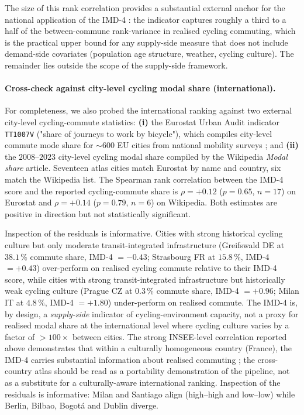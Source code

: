 \documentclass[11pt,a4paper]{article}
\begin{document}
The size of this rank correlation provides a substantial
external anchor for the national application of the IMD-4 :
the indicator captures roughly a third to a half of the
between-commune rank-variance in realised cycling commuting,
which is the practical upper bound for any supply-side measure
that does not include demand-side covariates (population
age structure, weather, cycling culture).  The remainder lies
outside the scope of the supply-side framework.

\paragraph{Cross-check against city-level cycling modal share
(international).}
For completeness, we also probed the international ranking
against two external city-level cycling-commute statistics:
\textbf{(i)} the Eurostat Urban Audit indicator \texttt{TT1007V}
("share of journeys to work by bicycle"), which compiles
city-level commute mode share for $\sim 600$ EU cities from
national mobility surveys ; and \textbf{(ii)} the
$2008$--$2023$ city-level cycling modal share compiled by the
Wikipedia \emph{Modal share} article.  Seventeen atlas cities
match Eurostat by name and country, six match the Wikipedia
list.  The Spearman rank correlation between the IMD-4 score
and the reported cycling-commute share is $\rho = +0.12$
($p = 0.65$, $n = 17$) on Eurostat and $\rho = +0.14$
($p = 0.79$, $n = 6$) on Wikipedia.  Both estimates are positive
in direction but not statistically significant.

Inspection of the residuals is informative.  Cities with strong
historical cycling culture but only moderate transit-integrated
infrastructure (Greifswald DE at $38.1\,\%$ commute share,
IMD-4 $= -0.43$; Strasbourg FR at $15.8\,\%$, IMD-4 $= +0.43$)
over-perform on realised cycling commute relative to their
IMD-4 score, while cities with strong transit-integrated
infrastructure but historically weak cycling culture
(Prague CZ at $0.3\,\%$ commute share, IMD-4 $= +0.96$;
Milan IT at $4.8\,\%$, IMD-4 $= +1.80$) under-perform on
realised commute.  The IMD-4 is, by design, a
\emph{supply-side} indicator of cycling-environment capacity, not
a proxy for realised modal share at the international level
where cycling culture varies by a factor of $> 100\times$
between cities.  The strong INSEE-level correlation reported
above demonstrates that within a culturally homogeneous country
(France), the IMD-4 carries substantial information about
realised commuting ; the cross-country atlas should be read as
a portability demonstration of the pipeline, not as a substitute
for a culturally-aware international ranking.  Inspection of the residuals is
informative: Milan and Santiago align (high–high and low–low)
while Berlin, Bilbao, Bogot\'a and Dublin diverge.
\end{document}
